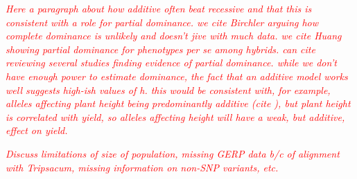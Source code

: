 \documentclass[twoside,twocolumn, letterpaper]{article}
\newcommand{\jri}[1]{\textcolor{red}{ \emph{ #1}} }
\begin{document}

\jri{Here a paragraph about how additive often beat recessive and that this is consistent with a role for partial dominance. we cite Birchler arguing how complete dominance is unlikely and doesn't jive with much data. we cite Huang showing partial dominance for phenotypes per se among hybrids. can cite \citep{halligan2009spontaneous} reviewing several studies finding evidence of partial dominance. while we don't have enough power to estimate dominance, the fact that an additive model works well suggests high-ish values of h. this would be consistent with, for example, alleles affecting plant height  being predominantly additive (cite \citep{peiffer2014genetic}), but plant height is correlated with yield, so alleles affecting height will have a weak, but additive, effect on yield.  }

\jri{Discuss limitations of size of population, missing GERP data b/c of alignment with Tripsacum, missing information on non-SNP variants, etc.}
\end{document}
